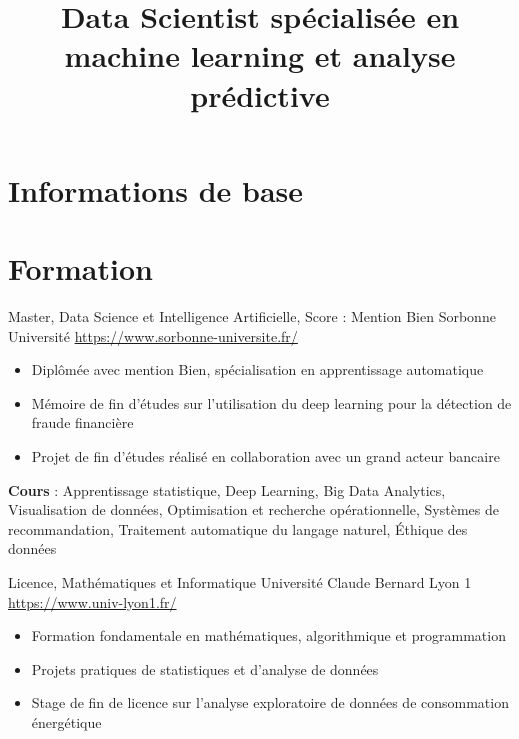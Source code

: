 \documentclass[a4paper, serif, 10pt]{moderncv}
\title{Data Scientist spécialisée en machine learning et analyse prédictive}
\begin{document}
\maketitle

\section{Informations de base}

\section{Formation}

        {Master, Data Science et Intelligence Artificielle, Score : Mention Bien}
        {Sorbonne Université}
        {\url{https://www.sorbonne-universite.fr/}}
        {}
        {\begin{itemize}
\item Diplômée avec mention Bien, spécialisation en apprentissage automatique
\item Mémoire de fin d'études sur l'utilisation du deep learning pour la détection de fraude financière
\item Projet de fin d'études réalisé en collaboration avec un grand acteur bancaire
\end{itemize}
\textbf{Cours} : Apprentissage statistique, Deep Learning, Big Data Analytics, Visualisation de données, Optimisation et recherche opérationnelle, Systèmes de recommandation, Traitement automatique du langage naturel, Éthique des données}

        {Licence, Mathématiques et Informatique}
        {Université Claude Bernard Lyon 1}
        {\url{https://www.univ-lyon1.fr/}}
        {}
        {\begin{itemize}
\item Formation fondamentale en mathématiques, algorithmique et programmation
\item Projets pratiques de statistiques et d'analyse de données
\item Stage de fin de licence sur l'analyse exploratoire de données de consommation énergétique
\end{itemize}}
\end{document}
